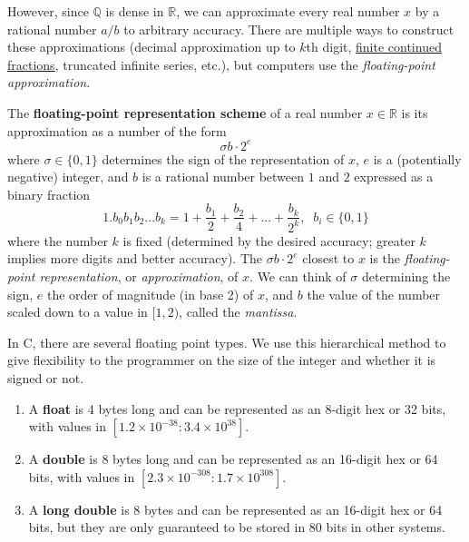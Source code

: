   However, since $\mathbb{Q}$ is dense in $\mathbb{R}$, we can approximate every real number $x$ by a rational number $a/b$ to arbitrary accuracy. There are multiple ways to construct these approximations (decimal approximation up to $k$th digit, \hyperref[nt-def:finite-continued-fraction]{finite continued fractions}, truncated infinite series, etc.), but computers use the \textit{floating-point approximation}. 

  \begin{definition}
    \label{def:floating-point-representation}
    The \textbf{floating-point representation scheme} of a real number $x \in \mathbb{R}$ is its approximation as a number of the form 
    \begin{equation}
      \sigma b \cdot 2^e
    \end{equation}
    where $\sigma \in \{0, 1\}$ determines the sign of the representation of $x$, $e$ is a (potentially negative) integer, and $b$ is a rational number between $1$ and $2$ expressed as a binary fraction 
    \begin{equation}
      1.b_0 b_1 b_2 ... b_k = 1 + \frac{b_1}{2} + \frac{b_2}{4} + ... + \frac{b_k}{2^k}, \;\; b_i \in \{0,1\}
    \end{equation}
    where the number $k$ is fixed (determined by the desired accuracy; greater $k$ implies more digits and better accuracy). The $\sigma b \cdot 2^e$ closest to $x$ is the \textit{floating-point representation}, or \textit{approximation}, of $x$. We can think of $\sigma$ determining the sign, $e$ the order of magnitude (in base 2) of $x$, and $b$ the value of the number scaled down to a value in $[1,2)$, called the \textit{mantissa}. 
  \end{definition}

  \begin{definition}
    \label{def:floating-point-types-in-c}
    In C, there are several floating point types. We use this hierarchical method to give flexibility to the programmer on the size of the integer and whether it is signed or not. 
    \begin{enumerate} 
      \item A \textbf{float} is 4 bytes long and can be represented as an 8-digit hex or 32 bits, with values in $[1.2 \times 10^{-38}: 3.4 \times 10^{38}]$. 
      \item A \textbf{double} is 8 bytes long and can be represented as an 16-digit hex or 64 bits, with values in $[2.3 \times 10^{-308}: 1.7 \times 10^{308}]$. 
      \item A \textbf{long double} is 8 bytes and can be represented as an 16-digit hex or 64 bits, but they are only guaranteed to be stored in 80 bits in other systems. 
    \end{enumerate}
  \end{definition}

